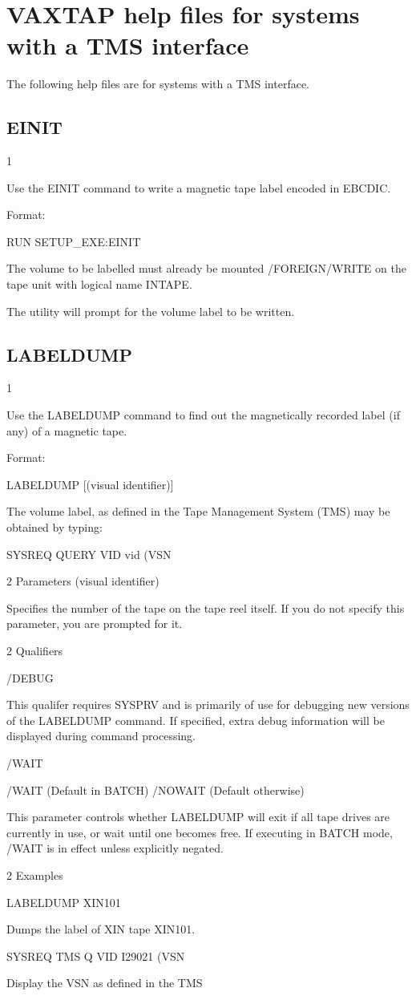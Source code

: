 \chapter{VAXTAP help files for systems with a TMS interface}
\par
The following help files are for systems with a TMS interface.
\section{EINIT}
\begin{XMP}
1 

  Use the EINIT command to write a magnetic tape label encoded in EBCDIC.

  Format:

  RUN SETUP_EXE:EINIT

  The volume to be labelled must already be mounted /FOREIGN/WRITE on
  the tape unit with logical name INTAPE.

  The utility will prompt for the volume label to be written.
\end{XMP}
\section{LABELDUMP}
\begin{XMP}
1 


   Use the LABELDUMP command to find out the magnetically recorded label
   (if any) of a magnetic tape.

   Format:

   LABELDUMP [(visual identifier)]

   The volume label, as defined in the Tape Management System (TMS)
   may be obtained by typing:

   SYSREQ QUERY VID vid (VSN



2 Parameters
  (visual identifier)

  Specifies the number of the tape on the tape reel itself.
  If you do not specify this parameter, you are prompted for it.

2 Qualifiers

/DEBUG

 This qualifer requires SYSPRV and is primarily of use for debugging
 new versions of the LABELDUMP command. If specified, extra debug information
 will be displayed during command processing.

/WAIT

   /WAIT     (Default in BATCH)
   /NOWAIT   (Default otherwise)

  This parameter controls whether LABELDUMP will exit if all tape drives
  are currently in use, or wait until one becomes free. If executing
  in BATCH mode, /WAIT is in effect unless explicitly negated.


2 Examples

  LABELDUMP XIN101

  Dumps the label of XIN tape XIN101.

  SYSREQ TMS Q VID I29021 (VSN

  Display the VSN as defined in the TMS

\end{XMP}
